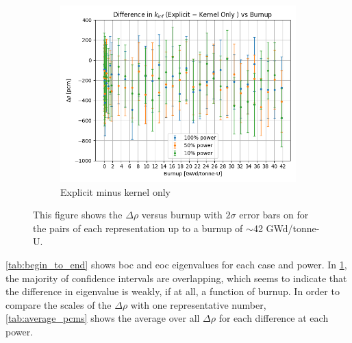 \documentclass[letterpaper]{physor2024}
\begin{document}
\begin{figure}[!h]
\begin{subfigure}{0.495\linewidth}
        \includegraphics[width=\linewidth]{figures/explicit_minus_kern.png}
        \caption{Explicit minus kernel only}
    \end{subfigure}
    \caption{This figure shows the $\Delta \rho$ versus burnup with $2\sigma$ error bars on \kinf for the pairs of each representation up to a burnup of $\sim$42 GWd/tonne-U.}
    \label{fig:pcm_diffs}
\end{figure}

\cref{tab:begin_to_end} shows \gls{boc} and \gls{eoc} eigenvalues for each case and power. In \cref{fig:pcm_diffs}, the majority of confidence intervals are overlapping, which seems to indicate that the difference in eigenvalue is weakly, if at all, a function of burnup. In order to compare the scales of the $\Delta \rho$ with one representative number, \cref{tab:average_pcms} shows the average over all $\Delta \rho$ for each difference at each power.
\end{document}
